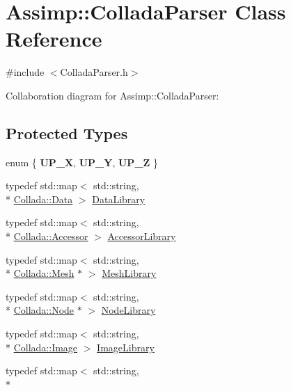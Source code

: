 \hypertarget{class_assimp_1_1_collada_parser}{\section{Assimp\+:\+:Collada\+Parser Class Reference}
\label{class_assimp_1_1_collada_parser}
}


{\ttfamily \#include $<$Collada\+Parser.\+h$>$}



Collaboration diagram for Assimp\+:\+:Collada\+Parser\+:
\subsection*{Protected Types}
\begin{DoxyCompactItemize}
\item 
enum \{ {\bfseries U\+P\+\_\+\+X}, 
{\bfseries U\+P\+\_\+\+Y}, 
{\bfseries U\+P\+\_\+\+Z}
 \}
\item 
typedef std\+::map$<$ std\+::string, \\*
\hyperlink{struct_assimp_1_1_collada_1_1_data}{Collada\+::\+Data} $>$ \hyperlink{class_assimp_1_1_collada_parser_a79a6311963fa5259e14edf7271063f03}{Data\+Library}
\item 
typedef std\+::map$<$ std\+::string, \\*
\hyperlink{struct_assimp_1_1_collada_1_1_accessor}{Collada\+::\+Accessor} $>$ \hyperlink{class_assimp_1_1_collada_parser_ae9cc736118cecbbebb1117247aa83ff7}{Accessor\+Library}
\item 
typedef std\+::map$<$ std\+::string, \\*
\hyperlink{struct_assimp_1_1_collada_1_1_mesh}{Collada\+::\+Mesh} $\ast$ $>$ \hyperlink{class_assimp_1_1_collada_parser_ae07977eafea3e73f8c2915319bbb143b}{Mesh\+Library}
\item 
typedef std\+::map$<$ std\+::string, \\*
\hyperlink{struct_assimp_1_1_collada_1_1_node}{Collada\+::\+Node} $\ast$ $>$ \hyperlink{class_assimp_1_1_collada_parser_a21771be88a79eb4ae05001bd205020ad}{Node\+Library}
\item 
typedef std\+::map$<$ std\+::string, \\*
\hyperlink{struct_assimp_1_1_collada_1_1_image}{Collada\+::\+Image} $>$ \hyperlink{class_assimp_1_1_collada_parser_ace5e0dc4f9f8eaa8a1d9e3195b432cac}{Image\+Library}
\item 
typedef std\+::map$<$ std\+::string, \\*

\end{DoxyCompactItemize}
